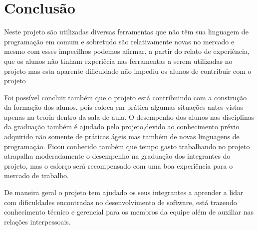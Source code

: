 \section{Conclusão}
\label{sec:conclusao}

Neste projeto são utilizadas diversas ferramentas que não têm sua linguagem de programação em comum e sobretudo são relativamente novas no mercado e mesmo com esses impecilhos podemos afirmar, a partir do relato de experiência, que os alunos não tinham experiêcia nas ferramentas a serem utilizadas no projeto mas esta aparente dificuldade não impediu os alunos de contribuir com o projeto

Foi possível concluir também que o projeto está contribuindo com a construção da formação dos alunos, pois coloca em prática algumas situações antes vistas apenas na teoria dentro da sala de aula. 
%
O desempenho dos alunos nas disciplinas da graduação também é ajudado pelo projeto,devido ao conhecimento prévio adquirido não somente de práticas ágeis mas também de novas linguagens de programação. 
%
Ficou conhecido também que tempo gasto trabalhando no projeto atrapalha moderadamente o desempenho na graduação dos integrantes do projeto, mas o esforço será recompensado com uma boa experiência para o mercado de trabalho.

De maneira geral o projeto tem ajudado os seus integrantes a aprender a lidar com dificuldades encontradas no desenvolvimento de software, está trazendo conhecimento técnico e gerencial para os membros da equipe além de auxiliar nas relações interpessoais.
